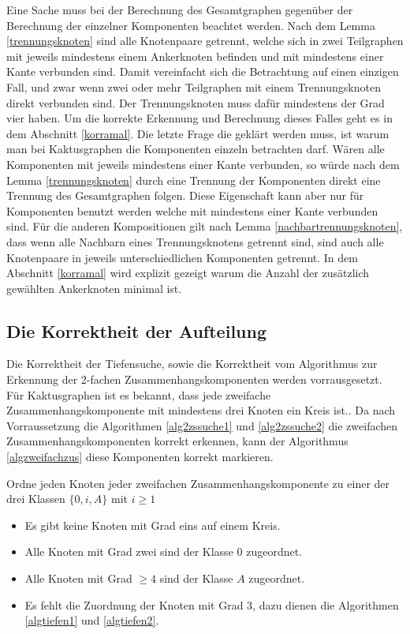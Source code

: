 Eine Sache muss bei der Berechnung des Gesamtgraphen gegenüber der Berechnung der einzelner Komponenten beachtet werden. Nach dem Lemma \ref{trennungsknoten} sind alle Knotenpaare getrennt, welche sich in zwei Teilgraphen mit jeweils mindestens einem Ankerknoten befinden und mit mindestens einer Kante verbunden sind. Damit vereinfacht sich die Betrachtung auf einen einzigen Fall, und zwar wenn zwei oder mehr Teilgraphen mit einem Trennungsknoten direkt verbunden sind. Der Trennungsknoten muss dafür mindestens der Grad vier haben. Um die korrekte Erkennung und Berechnung dieses Falles geht es in dem Abschnitt \ref{korramal}.\newline\newline
Die letzte Frage die geklärt werden muss, ist warum man bei Kaktusgraphen die Komponenten einzeln betrachten darf. Wären alle Komponenten mit jeweils mindestens einer Kante verbunden, so würde nach dem Lemma \ref{trennungsknoten} durch eine Trennung der Komponenten direkt eine Trennung des Gesamtgraphen folgen. Diese Eigenschaft kann aber nur für Komponenten benutzt werden welche mit mindestens einer Kante verbunden sind. Für die anderen Kompositionen gilt nach Lemma \ref{nachbartrennungsknoten}, dass wenn alle Nachbarn eines Trennungsknotens getrennt sind, sind auch alle Knotenpaare in jeweils unterschiedlichen Komponenten getrennt. In dem Abschnitt \ref{korramal} wird explizit gezeigt warum die Anzahl der zusätzlich gewählten Ankerknoten minimal ist.
\subsection{Die Korrektheit der Aufteilung}
\label{korraufteilung}
Die Korrektheit der Tiefensuche, sowie die Korrektheit vom Algorithmus zur Erkennung der 2-fachen Zusammenhangskomponenten werden vorrausgesetzt.\\
Für Kaktusgraphen ist es bekannt, dass jede zweifache Zusammenhangskomponente mit mindestens drei Knoten ein Kreis ist.\cite{}. Da nach Vorraussetzung die Algorithmen \ref{alg2zssuche1} und \ref{alg2zssuche2} die zweifachen Zusammenhangskomponenten korrekt erkennen, kann der Algorithmus \ref{algzweifachzus} diese Komponenten korrekt markieren.
\begin{bem}
Ordne jeden Knoten jeder zweifachen Zusammenhangskomponente zu einer der drei Klassen $\{0,i,A\}$ mit $i \geq 1$
\begin{itemize}
\item Es gibt keine Knoten mit Grad eins auf einem Kreis.
\item Alle Knoten mit Grad zwei sind der Klasse $0$ zugeordnet.
\item Alle Knoten mit Grad $\geq 4$ sind der Klasse $A$ zugeordnet.
\item Es fehlt die Zuordnung der Knoten mit Grad $3$, dazu dienen die Algorithmen \ref{algtiefen1} und \ref{algtiefen2}.
\end{itemize}
\end{bem}
